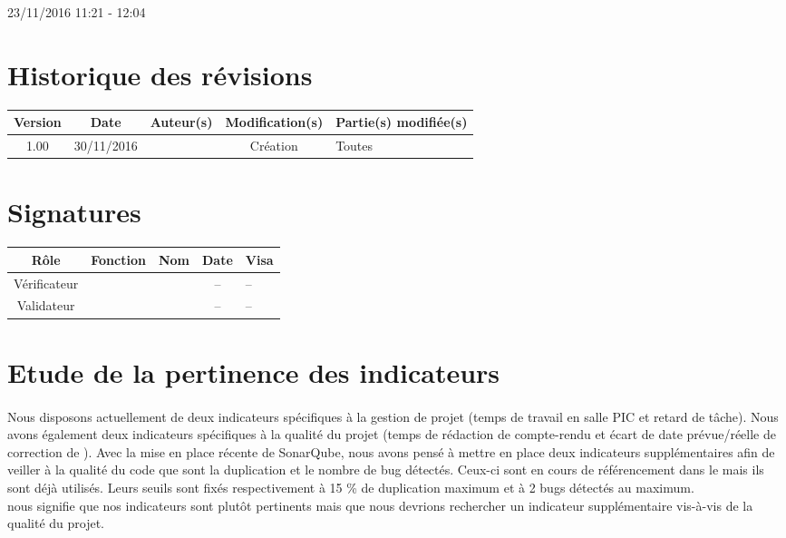 \documentclass [a4paper] {article}
\begin{document}
\rhead{}

23/11/2016
\hfill   
\hfill 	11:21 - 12:04 				%



\section*{Historique des révisions}
\begin{center}
			\begin{tabular}{| c | c | c | c | p{4cm} |}
				\hline
				\rowcolor{Gray}
				Version & Date & Auteur(s) & Modification(s) & Partie(s) modifiée(s)		 \\
				\hline
				1.00 & 30/11/2016 & \Kafui & Création & Toutes \\
		\hline		
			\end{tabular}
		\end{center}

\section*{Signatures}

		\begin{center}
			\begin{tabular}{| c | c | c | c | p{4cm} |}
				\hline
				\rowcolor{Gray}
				Rôle & Fonction & Nom & Date & Visa		 \\
				\hline
				Vérificateur & \RGC & \Melissa & -- & -- \\[30pt]
				\hline
				Validateur & \CP & \Pierre & -- & -- \\[30pt]	
				\hline
			\end{tabular}
		\end{center}


\section{Etude de la pertinence des indicateurs}
\paragraph*{}
Nous disposons actuellement de deux indicateurs spécifiques à la gestion de projet (temps de travail en salle PIC et retard de tâche). Nous avons également deux indicateurs spécifiques à la qualité du projet (temps de rédaction de compte-rendu et écart de date prévue/réelle de correction de \FT{}).
Avec la mise en place récente de SonarQube, nous avons pensé à mettre en place deux indicateurs supplémentaires afin de veiller à la qualité du code que sont la duplication et le nombre de bug détectés. Ceux-ci sont en cours de référencement dans le \PQ{} mais ils sont déjà utilisés.
Leurs seuils sont fixés respectivement à 15 \% de duplication maximum et à 2 bugs détectés au maximum.\\
\nomTuteurQualite{} nous signifie que nos indicateurs sont plutôt pertinents mais que nous devrions rechercher un indicateur supplémentaire vis-à-vis de la qualité du projet.
\end{document}
